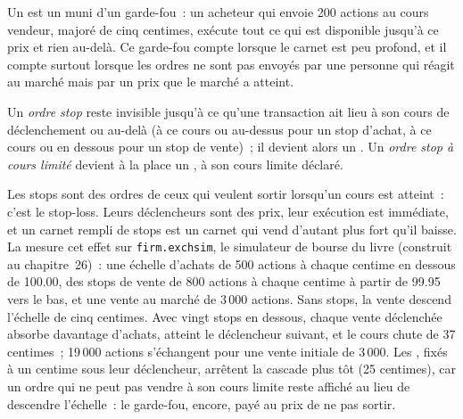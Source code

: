 Un  est un  muni d'un garde-fou~: un acheteur qui envoie 200 actions au cours vendeur, majoré de cinq centimes, exécute tout ce qui est disponible
jusqu'à ce prix et rien au-delà. Ce garde-fou compte lorsque le carnet est peu profond, et il compte surtout lorsque les ordres ne sont pas envoyés par une personne qui réagit au marché
mais par un prix que le marché a atteint.

\begin{definition}\label{def:mx:order-types-and-their-uses:stop}
Un \emph{ordre stop} reste invisible jusqu'à ce qu'une transaction ait lieu à son cours de déclenchement ou au-delà (à ce cours ou au-dessus pour un stop d'achat, à ce cours ou en dessous pour
un stop de vente)~; il devient alors un . Un \emph{ordre stop à cours limité} devient à la place un , à son cours limite déclaré.
\end{definition}

Les stops sont des ordres de ceux qui veulent sortir lorsqu'un cours est atteint~: c'est le stop-loss. Leurs déclencheurs sont des prix, leur exécution est immédiate, et
un carnet rempli de stops est un carnet qui vend d'autant plus fort qu'il baisse. La  mesure cet effet sur
\texttt{firm.exchsim}, le simulateur de bourse du livre (construit au chapitre~26)~: une échelle d'achats de 500 actions à chaque centime en dessous de 100.00, des stops de vente de 800 actions
à chaque centime à partir de 99.95 vers le bas, et une vente au marché de 3\,000 actions. Sans stops, la vente descend l'échelle de cinq centimes. Avec vingt stops en dessous,
chaque vente déclenchée absorbe davantage d'achats, atteint le déclencheur suivant, et le cours chute de 37 centimes~; 19\,000 actions s'échangent pour une vente initiale de 3\,000.
Les , fixés à un centime sous leur déclencheur, arrêtent la cascade plus tôt (25 centimes), car un ordre qui ne peut pas vendre à son cours limite reste affiché
au lieu de descendre l'échelle~: le garde-fou, encore, payé au prix de ne pas sortir.

